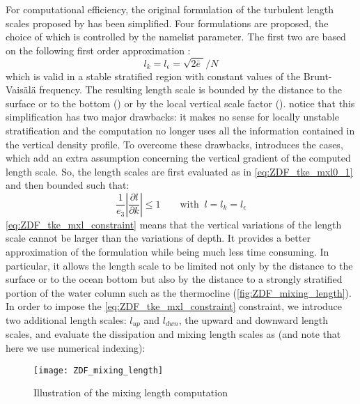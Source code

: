 \documentclass[../main/NEMO_manual]{subfiles}
\begin{document}
For computational efficiency, the original formulation of the turbulent length scales proposed by
\citet{gaspar.gregoris.ea_JGR90} has been simplified.
Four formulations are proposed, the choice of which is controlled by the  namelist parameter.
The first two are based on the following first order approximation \citep{blanke.delecluse_JPO93}:
\begin{equation}
  \label{eq:ZDF_tke_mxl0_1}
  l_k = l_\epsilon = \sqrt {2 \bar{e}\; } / N
\end{equation}
which is valid in a stable stratified region with constant values of the Brunt-Vais\"{a}l\"{a} frequency.
The resulting length scale is bounded by the distance to the surface or to the bottom
() or by the local vertical scale factor ().
\citet{blanke.delecluse_JPO93} notice that this simplification has two major drawbacks:
it makes no sense for locally unstable stratification and the computation no longer uses all
the information contained in the vertical density profile.
To overcome these drawbacks, \citet{madec.delecluse.ea_NPM98} introduces the  cases,
which add an extra assumption concerning the vertical gradient of the computed length scale.
So, the length scales are first evaluated as in \autoref{eq:ZDF_tke_mxl0_1} and then bounded such that:
\begin{equation}
  \label{eq:ZDF_tke_mxl_constraint}
  \frac{1}{e_3 }\left| {\frac{\partial l}{\partial k}} \right| \leq 1
  \qquad \text{with }\  l =  l_k = l_\epsilon
\end{equation}
\autoref{eq:ZDF_tke_mxl_constraint} means that the vertical variations of the length scale cannot be larger than
the variations of depth.
It provides a better approximation of the \citet{gaspar.gregoris.ea_JGR90} formulation while being much less
time consuming.
In particular, it allows the length scale to be limited not only by the distance to the surface or
to the ocean bottom but also by the distance to a strongly stratified portion of the water column such as
the thermocline (\autoref{fig:ZDF_mixing_length}).
In order to impose the \autoref{eq:ZDF_tke_mxl_constraint} constraint, we introduce two additional length scales:
$l_{up}$ and $l_{dwn}$, the upward and downward length scales, and
evaluate the dissipation and mixing length scales as
(and note that here we use numerical indexing):
\begin{figure}[!t]
  \centering
  \texttt{[image: ZDF\_mixing\_length]}
  \caption[Mixing length computation]{Illustration of the mixing length computation}
  \label{fig:ZDF_mixing_length}
\end{figure}
\end{document}
